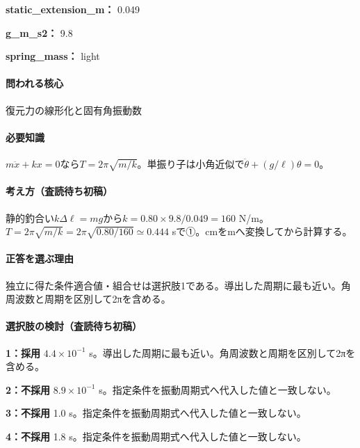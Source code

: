 \noindent\textbf{static\_extension\_m：} 0.049\par

\noindent\textbf{g\_m\_s2：} 9.8\par

\noindent\textbf{spring\_mass：} light\par

\paragraph{問われる核心} 復元力の線形化と固有角振動数

\paragraph{必要知識} \(m\ddot x+kx=0\)なら\(T=2\pi\sqrt{m/k}\)。単振り子は小角近似で\(\ddot\theta+(g/\ell)\theta=0\)。

\paragraph{考え方（査読待ち初稿）} 静的釣合い\(k\Delta\ell=mg\)から\(k=0.80\times9.8/0.049=160\) N/m。\(T=2\pi\sqrt{m/k}=2\pi\sqrt{0.80/160}\simeq0.444\) sで①。cmをmへ変換してから計算する。

\paragraph{正答を選ぶ理由} 独立に得た条件適合値・組合せは選択肢1である。導出した周期に最も近い。角周波数と周期を区別して2πを含める。

\paragraph{選択肢の検討（査読待ち初稿）}\mbox{}\par

\noindent\textbf{1：採用} \(4.4\times10^{-1}\) s。導出した周期に最も近い。角周波数と周期を区別して2πを含める。\par

\noindent\textbf{2：不採用} \(8.9\times10^{-1}\) s。指定条件を振動周期式へ代入した値と一致しない。\par

\noindent\textbf{3：不採用} 1.0 s。指定条件を振動周期式へ代入した値と一致しない。\par

\noindent\textbf{4：不採用} 1.8 s。指定条件を振動周期式へ代入した値と一致しない。\par

